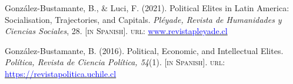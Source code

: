 





\begin{publications}

\begin{benumerate}{2}

\item{\small Gonz\'alez-Bustamante, B., \& Luci, F. (2021). Political Elites in Latin America: Socialisation, Trajectories, and Capitals. {\itshape Pl\'eyade, Revista de Humanidades y Ciencias Sociales}, 28. {\footnotesize \scshape [in Spanish]}. {\scshape url}: \href{http://www.revistapleyade.cl/index.php/OJS/issue/view/30}{\textcolor{blue}{www.revistapleyade.cl}}}\vspace{1mm}

\item{\small Gonz\'alez-Bustamante, B. (2016). Political, Economic, and Intellectual Elites. {\itshape Pol\'itica, Revista de Ciencia Pol\'itica, 54}(1). {\footnotesize \scshape [in Spanish]}. {\scshape url}: \href{https://revistapolitica.uchile.cl/index.php/RP/issue/view/4365}{\textcolor{blue}{https://revistapolitica.uchile.cl}}}\vspace{1mm}

\end{benumerate}

\end{publications}